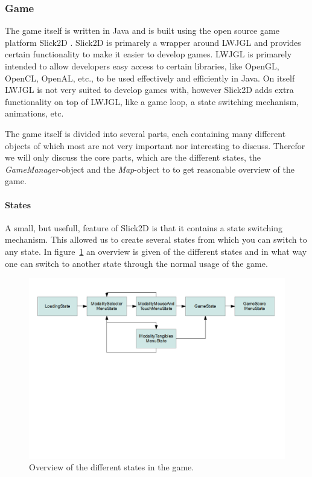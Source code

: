 \documentclass[a4paper,10pt]{article}
\begin{document}
		\subsubsection{Game}
		The game itself is written in Java and is built using the open source game platform Slick2D \cite{Slick2D}.
		Slick2D is primarely a wrapper around LWJGL \cite{LWJGL} and provides certain functionality to make it easier to develop games.
		LWJGL is primarely intended to allow developers easy access to certain libraries, like OpenGL, OpenCL, OpenAL, etc., to be used effectively and efficiently in Java.
		On itself LWJGL is not very suited to develop games with, however Slick2D adds extra functionality on top of LWJGL, like a game loop, a state switching mechanism, animations, etc.
		
		The game itself is divided into several parts, each containing many different objects of which most are not very important nor interesting to discuss.
		Therefor we will only discuss the core parts, which are the different states, the \emph{GameManager}-object and the \emph{Map}-object to to get reasonable overview of the game.
		
		\paragraph{States}
		A small, but usefull, feature of Slick2D is that it contains a state switching mechanism.
		This allowed us to create several states from which you can switch to any state.
		In figure~\ref{fig:game-state-diagram} an overview is given of the different states and in what way one can switch to another state through the normal usage of the game.
		
		
		\begin{figure}
			\includegraphics[width=\columnwidth]{images/game-state-diagram.png}
			\caption{Overview of the different states in the game.}
			\label{fig:game-state-diagram}
		\end{figure}
		
\end{document}
